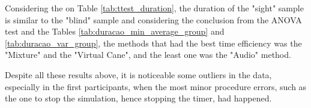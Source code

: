 Considering the on Table \ref{tab:ttest_duration}, the duration of the "sight" sample is similar to the "blind" sample and considering the conclusion from the ANOVA test and the Tables \ref{tab:duracao_min_average_group} and \ref{tab:duracao_var_group}, the methods that had the best time efficiency was the "Mixture" and the "Virtual Cane", and the least one was the "Audio" method.

Despite all these results above, it is noticeable some outliers in the data, especially in the first participants, when the most minor procedure errors, such as the one to stop the simulation, hence stopping the timer, had happened.


\FloatBarrier